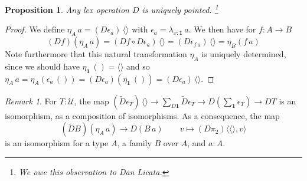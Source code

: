 \documentclass[10pt,a4paper,draft]{article}
\newcommand{\Unit}{\mathbf{1}}
\newcommand{\UU}{\mathcal{U}}%
\newcommand{\unit}{()} %
\newcommand{\unitF}{\langle \rangle}
\newcommand{\pairF}[2]{\langle #1,#2 \rangle}
\newcommand{\D}{D}              %
\newcommand{\DD}{\tilde{D}} %
\renewcommand{\~}{\widetilde}
\newtheorem{proposition}[theorem]{Proposition}
\theoremstyle{definition}
\theoremstyle{remark} %
\newtheorem{remark}[theorem]{Remark}
\begin{document}
\begin{proposition} \label{lex-operation-pointed}
  Any lex operation $\D$ is uniquely pointed.%
  \footnote{We owe this observation to Dan Licata.}
\end{proposition}

\begin{proof}
  We define $\eta_A\, a = (\D\epsilon_a)\,\unitF$ with $\epsilon_a = \lambda_{x:\Unit}\,a$.
  We then have for $f:A\rightarrow B$
  \begin{equation*}
  (\D f)(\eta_A\, a) = (\D f\circ \D\epsilon_a)\,\unitF = (\D\epsilon_{f\,a})\,\unitF = \eta_B(f\,a)
  \end{equation*}
  Note furthermore that this natural transformation $\eta_A$ is uniquely determined,
  since we should have $\eta_{\Unit}\,\unit = \unitF$ and so
  $\eta_A\, a = \eta_A(\epsilon_a\,\unit) = (\D\epsilon_a)(\eta_{\Unit}\,\unit) = (\D\epsilon_a)\,\unitF$.
\end{proof}

\begin{remark}\label{iso}
  For $T : \UU$, the map
  $(\DD \epsilon_T)\,\unitF\rightarrow \sum_{\D\Unit}\DD \epsilon_T\rightarrow
  \D(\sum_{\Unit}\epsilon_T)\rightarrow \D T$ is an isomorphism, as a composition
  of isomorphisms.
  As a consequence, the map
  \begin{equation*}
  (\DD B)(\eta_A\, a)\longrightarrow \D(B\,a)\qquad v\longmapsto (\D\pi_2)\pairF{\unitF}{v}
  \end{equation*}
  is an isomorphism for a type $A$, a family $B$ over $A$, and $a : A$.
\end{remark}


\end{document}
